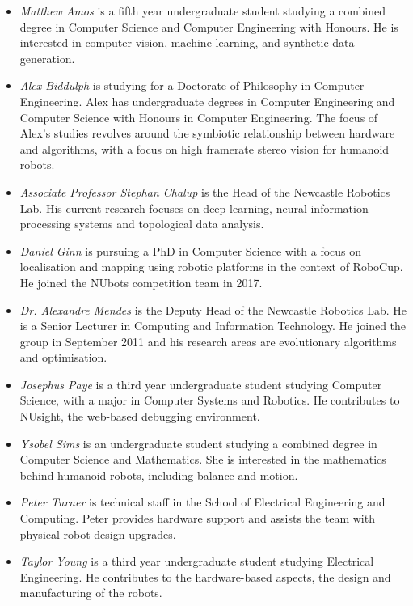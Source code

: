 \documentclass{llncs}
\begin{document}
\begin{itemize}
\item \emph{Matthew Amos} is a fifth year undergraduate student studying a combined degree in Computer Science and Computer Engineering with Honours. He is interested in computer vision, machine learning, and synthetic data generation.

\item \emph{Alex Biddulph} is studying for a Doctorate of Philosophy in Computer Engineering. Alex has undergraduate degrees in Computer Engineering and Computer Science with Honours in Computer Engineering. The focus of Alex's studies revolves around the symbiotic relationship between hardware and algorithms, with a focus on high framerate stereo vision for humanoid robots.

\item \emph{Associate Professor Stephan Chalup} is the Head of the Newcastle Robotics Lab. His current research focuses on deep learning, neural information processing systems and topological data analysis.

\item \emph{Daniel Ginn} is pursuing a PhD in Computer Science with a focus on localisation and mapping using robotic platforms in the context of RoboCup. He joined the NUbots competition team in 2017.

\item \emph{Dr. Alexandre Mendes} is the Deputy Head of the Newcastle Robotics Lab. He is a Senior Lecturer in Computing and Information Technology. He joined the group in September 2011 and his research areas are evolutionary algorithms and optimisation.

\item \emph{Josephus Paye} is a third year undergraduate student studying Computer Science, with a major in Computer Systems and Robotics. He contributes to NUsight, the web-based debugging environment.

\item \emph{Ysobel Sims} is an undergraduate student studying a combined degree in Computer Science and Mathematics. She is interested in the mathematics behind humanoid robots, including balance and motion.

\item \emph{Peter Turner} is technical staff in the School of Electrical Engineering and Computing. Peter provides hardware support and assists the team with physical robot design upgrades.

\item \emph{Taylor Young} is a third year undergraduate student studying Electrical Engineering. He contributes to the hardware-based aspects, the design and manufacturing of the robots.

\end{itemize}
\end{document}
